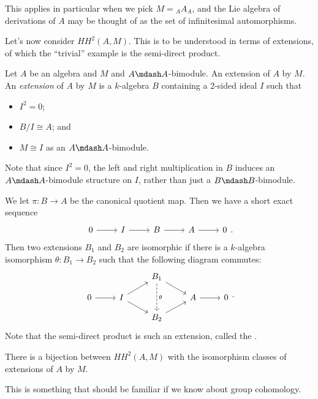 \documentclass[a4paper]{article}
\newcommand\HH{H\!H}
\begin{document}
This applies in particular when we pick $M = {_AA_A}$, and the Lie algebra of derivations of $A$ may be thought of as the set of infinitesimal automorphisms.

\separator

Let's now consider $\HH^2(A, M)$. This is to be understood in terms of extensions, of which the ``trivial'' example is the semi-direct product.

\begin{defi}[Extension]
  Let $A$ be an algebra and $M$ and $A\mdash A$-bimodule. An extension of $A$ by $M$. An \emph{extension} of $A$ by $M$ is a $k$-algebra $B$ containing a 2-sided ideal $I$ such that
  \begin{itemize}
    \item $I^2 = 0$;
    \item $B/I \cong A$; and
    \item $M \cong I$ as an $A\mdash A$-bimodule.
  \end{itemize}
  Note that since $I^2 = 0$, the left and right multiplication in $B$ induces an $A\mdash A$-bimodule structure on $I$, rather than just a $B\mdash B$-bimodule.
\end{defi}

We let $\pi: B \to A$ be the canonical quotient map. Then we have a short exact sequence
\[
  \begin{tikzcd}
    0 \ar[r] & I \ar[r] & B \ar[r] & A \ar[r] & 0
  \end{tikzcd}.
\]
Then two extensions $B_1$ and $B_2$ are isomorphic if there is a $k$-algebra isomorphism $\theta: B_1 \to B_2$ such that the following diagram commutes:
\[
  \begin{tikzcd}[row sep=small]
    & & B_1 \ar[rd] \ar[dd, dashed, "\theta"]\\
    0 \ar[r] & I \ar[ur] \ar[dr] & & A \ar[r] & 0\\
    & & B_2 \ar[ur]
  \end{tikzcd}.
\]
Note that the semi-direct product is such an extension, called the .

\begin{prop}
  There is a bijection between $\HH^2(A, M)$ with the isomorphism classes of extensions of $A$ by $M$.
\end{prop}
This is something that should be familiar if we know about group cohomology.
\end{document}
